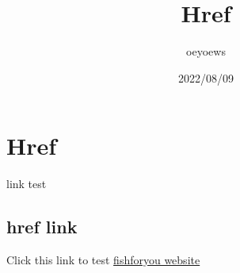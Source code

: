 \documentclass{article}
\title{Href}
\author{oeyoews}
\date{2022/08/09}
\begin{document}
\maketitle

\newpage

\section*{Href}

link test

\subsection{href link}%

Click this link to test
\href{https://oeyoew.fun}{fishforyou website}
\end{document}
